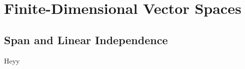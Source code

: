 \chapter{Finite-Dimensional Vector Spaces}

\section{Span and Linear Independence}

\begin{exercise}
    Heyy
\end{exercise}